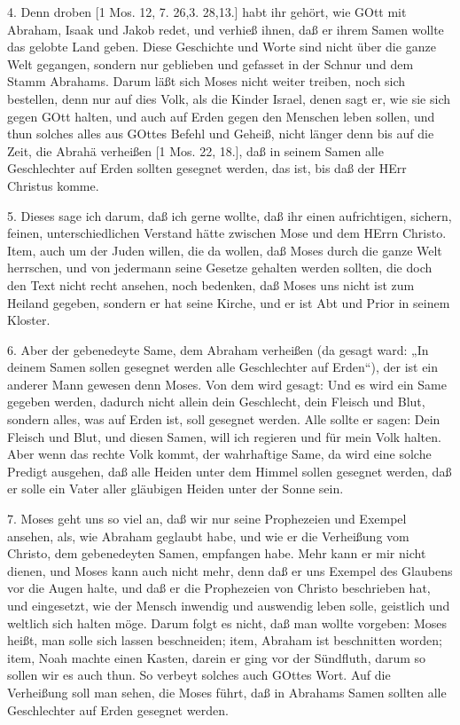 4. Denn droben [1 Mos. 12, 7. 26,3. 28,13.] habt ihr gehört, wie GOtt mit Abraham, Isaak und Jakob redet, und verhieß ihnen, daß er ihrem Samen wollte das gelobte Land geben. Diese Geschichte und Worte sind nicht über die ganze Welt gegangen, sondern nur geblieben und gefasset in der Schnur und dem Stamm Abrahams. Darum läßt sich Moses nicht weiter treiben, noch sich bestellen, denn nur auf dies Volk, als die Kinder Israel, denen sagt er, wie sie sich gegen GOtt halten, und auch auf Erden gegen den Menschen leben sollen, und thun solches alles aus GOttes Befehl und Geheiß, nicht länger denn bis auf die Zeit, die Abrahä verheißen [1 Mos. 22, 18.], daß in seinem Samen alle Geschlechter auf Erden sollten gesegnet werden, das ist, bis daß der HErr Christus komme.

5. Dieses sage ich darum, daß ich gerne wollte, daß ihr einen aufrichtigen, sichern, feinen, unterschiedlichen Verstand hätte zwischen Mose und dem HErrn Christo. Item, auch um der Juden willen, die da wollen, daß Moses durch die ganze Welt herrschen, und von jedermann seine Gesetze gehalten werden sollten, die doch den Text nicht recht ansehen, noch bedenken, daß Moses uns nicht ist zum Heiland gegeben, sondern er hat seine Kirche, und er ist Abt und Prior in seinem Kloster.

6. Aber der gebenedeyte Same, dem Abraham verheißen (da gesagt ward: „In deinem Samen sollen gesegnet werden alle Geschlechter auf Erden“), der ist ein anderer Mann gewesen denn Moses. Von dem wird gesagt: Und es wird ein Same gegeben werden, dadurch nicht allein dein Geschlecht, dein Fleisch und Blut, sondern alles, was auf Erden ist, soll gesegnet werden. Alle sollte er sagen: Dein Fleisch und Blut, und diesen Samen, will ich regieren und für mein Volk halten. Aber wenn das rechte Volk kommt, der wahrhaftige Same, da wird eine solche Predigt ausgehen, daß alle Heiden unter dem Himmel sollen gesegnet werden, daß er solle ein Vater aller gläubigen Heiden unter der Sonne sein.

7. Moses geht uns so viel an, daß wir nur seine Prophezeien und Exempel ansehen, als, wie Abraham geglaubt habe, und wie er die Verheißung vom Christo, dem gebenedeyten Samen, empfangen habe. Mehr kann er mir nicht dienen, und Moses kann auch nicht mehr, denn daß er uns Exempel des Glaubens vor die Augen halte, und daß er die Prophezeien von Christo beschrieben hat, und eingesetzt, wie der Mensch inwendig und auswendig leben solle, geistlich und weltlich sich halten möge. Darum folgt es nicht, daß man wollte vorgeben: Moses heißt, man solle sich lassen beschneiden; item, Abraham ist beschnitten worden; item, Noah machte einen Kasten, darein er ging vor der Sündfluth, darum so sollen wir es auch thun. So verbeyt solches auch GOttes Wort. Auf die Verheißung soll man sehen, die Moses führt, daß in Abrahams Samen sollten alle Geschlechter auf Erden gesegnet werden.

